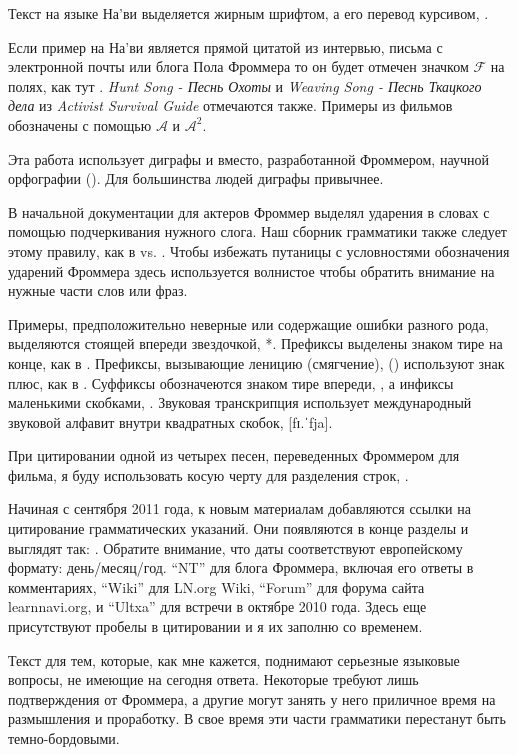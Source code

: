 Текст на языке На'ви выделяется жирным шрифтом, а его перевод курсивом,  .

Если пример на На'ви является прямой цитатой из интервью, письма с электронной почты или блога Пола Фроммера то он будет отмечен значком
$\mathcal{F}$ на полях, как тут . 
\textit{Hunt Song - Песнь Охоты} и \textit{Weaving Song - Песнь Ткацкого дела} из
\textit{Activist Survival Guide} отмечаются также.  Примеры из фильмов обозначены с помощью $\mathcal{A}$ и $\mathcal{A}^2$.

Эта работа использует диграфы  и  вместо, разработанной Фроммером, научной орфографии ().  Для большинства людей диграфы  привычнее.

В начальной документации для актеров Фроммер выделял ударения в словах с помощью подчеркивания нужного слога.  Наш сборник грамматики также следует этому правилу, как в   vs. 
.  Чтобы избежать путаницы с условностями обозначения ударений Фроммера здесь используется волнистое  чтобы обратить внимание на нужные части слов или фраз.

Примеры, предположительно неверные или содержащие ошибки  разного рода, выделяются стоящей впереди звездочкой, *.  Префиксы выделены знаком тире на конце, как в .  Префиксы, вызывающие леницию (смягчение), () используют знак плюс, как в .
Суффиксы обозначеются знаком тире впереди, , а инфиксы маленькими скобками, .  Звуковая транскрипция использует международный звуковой алфавит внутри квадратных скобок, [fɪ.ˈfja].

При цитировании одной из четырех песен, переведенных Фроммером для фильма, я буду использовать косую черту для разделения строк, .

Начиная с сентября 2011 года, к новым материалам добавляются ссылки на цитирование грамматических указаний.  Они появляются в конце разделы и выглядят так:
.
Обратите внимание, что даты соответствуют европейскому формату: день/месяц/год.
``NT'' для блога Фроммера, включая его ответы в комментариях,
``Wiki'' для LN.org Wiki, ``Forum'' для форума сайта learnnavi.org, и
``Ultxa'' для встречи в октябре 2010 года.  Здесь еще присутствуют пробелы в цитировании и я их заполню со временем.

Текст  для тем, которые, как мне кажется, поднимают серьезные языковые вопросы, не имеющие на сегодня ответа.  Некоторые требуют лишь подтверждения от Фроммера, а другие могут занять у него приличное время на размышления и проработку. В свое время эти части грамматики перестанут быть темно-бордовыми.


